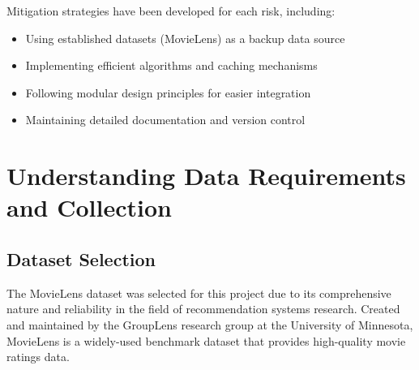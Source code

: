 \documentclass[12pt]{article}
\begin{document}
Mitigation strategies have been developed for each risk, including:
\begin{itemize}
    \item Using established datasets (MovieLens) as a backup data source
    \item Implementing efficient algorithms and caching mechanisms
    \item Following modular design principles for easier integration
    \item Maintaining detailed documentation and version control
\end{itemize}

\section{Understanding Data Requirements and Collection}

\subsection{Dataset Selection}
The MovieLens dataset was selected for this project due to its comprehensive nature and reliability in the field of recommendation systems research. Created and maintained by the GroupLens research group at the University of Minnesota, MovieLens is a widely-used benchmark dataset that provides high-quality movie ratings data.
\end{document}
